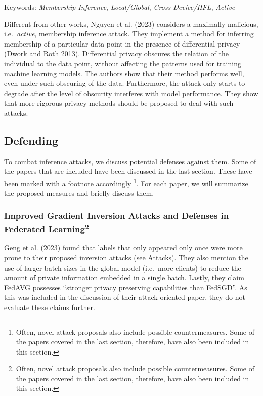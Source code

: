 \documentclass[
  compsoc]{IEEEtran}
\begin{document}
Keywords: \emph{Membership Inference}, \emph{Local/Global},
\emph{Cross-Device/HFL}, \emph{Active}

Different from other works, Nguyen et al. (2023) considers a maximally
malicious, i.e.~\emph{active}, membership inference attack. They
implement a method for inferring membership of a particular data point
in the presence of differential privacy (Dwork and Roth 2013).
Differential privacy obscures the relation of the individual to the data
point, without affecting the patterns used for training machine learning
models. The authors show that their method performs well, even under
such obscuring of the data. Furthermore, the attack only starts to
degrade after the level of obscurity interferes with model performance.
They show that more rigorous privacy methods should be proposed to deal
with such attacks.

\hypertarget{defending}{%
\subsection{Defending}\label{defending}}

To combat inference attacks, we discuss potential defenses against them.
Some of the papers that are included have been discussed in the last
section. These have been marked with a footnote accordingly \footnote{Often,
  novel attack proposals also include possible countermeasures. Some of
  the papers covered in the last section, therefore, have also been
  included in this section.}. For each paper, we will summarize the
proposed measures and briefly discuss them.

\hypertarget{improved-gradient-inversion-attacks-and-defenses-in-federated-learning1}{%
\subsubsection[Improved Gradient Inversion Attacks and Defenses in
Federated Learning]{\texorpdfstring{Improved Gradient Inversion Attacks
and Defenses in Federated
Learning\footnote{Often, novel attack proposals also include possible
  countermeasures. Some of the papers covered in the last section,
  therefore, have also been included in this section.}}{Improved Gradient Inversion Attacks and Defenses in Federated Learning}}\label{improved-gradient-inversion-attacks-and-defenses-in-federated-learning1}}

Geng et al. (2023) found that labels that only appeared only once were
more prone to their proposed inversion attacks (see
\protect\hyperlink{improved-gradient-inversion-attacks-and-defenses-in-federated-learning}{Attacks}).
They also mention the use of larger batch sizes in the global model
(i.e.~more clients) to reduce the amount of private information embedded
in a single batch. Lastly, they claim FedAVG possesses ``stronger
privacy preserving capabilities than FedSGD''. As this was included in
the discussion of their attack-oriented paper, they do not evaluate
these claims further.
\end{document}
